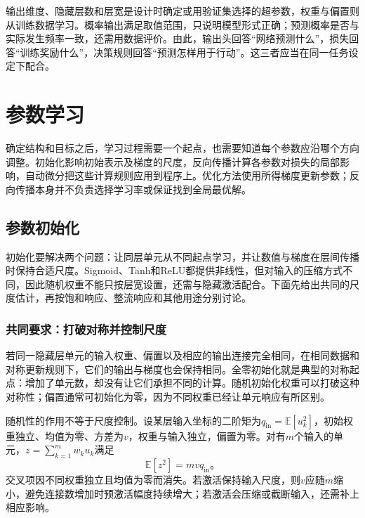 输出维度、隐藏层数和层宽是设计时确定或用验证集选择的超参数，权重与偏置则从训练数据学习。概率输出满足取值范围，只说明模型形式正确；预测概率是否与实际发生频率一致，还需用数据评价。由此，输出头回答“网络预测什么”，损失回答“训练奖励什么”，决策规则回答“预测怎样用于行动”。这三者应当在同一任务设定下配合。

\section{参数学习}
\label{sec:ffn-learning}

确定结构和目标之后，学习过程需要一个起点，也需要知道每个参数应沿哪个方向调整。初始化影响初始表示及梯度的尺度，反向传播计算各参数对损失的局部影响，自动微分把这些计算规则应用到程序上。优化方法使用所得梯度更新参数；反向传播本身并不负责选择学习率或保证找到全局最优解。

\subsection{参数初始化}
\label{sec:ffn-initialization}

初始化要解决两个问题：让同层单元从不同起点学习，并让数值与梯度在层间传播时保持合适尺度。Sigmoid、Tanh和ReLU都提供非线性，但对输入的压缩方式不同，因此随机权重不能只按层宽设置，还需与隐藏激活配合。下面先给出共同的尺度估计，再按饱和响应、整流响应和其他用途分别讨论。

\subsubsection{共同要求：打破对称并控制尺度}
\label{sec:ffn-initialization-common}

若同一隐藏层单元的输入权重、偏置以及相应的输出连接完全相同，在相同数据和对称更新规则下，它们的输出与梯度也会保持相同。全零初始化就是典型的对称起点：增加了单元数，却没有让它们承担不同的计算。随机初始化权重可以打破这种对称性；偏置通常可初始化为零，因为不同权重已经让单元响应有所区别。

随机性的作用不等于尺度控制。设某层输入坐标的二阶矩为$q_{\mathrm{in}}=\mathbb{E}[u_k^2]$，初始权重独立、均值为零、方差为$v$，权重与输入独立，偏置为零。对有$m$个输入的单元，$z=\sum_{k=1}^{m}w_k u_k$满足
\begin{equation}
  \mathbb{E}[z^2]=m v q_{\mathrm{in}}\text{。}
  \label{eq:ffn-initial-signal-scale}
\end{equation}
交叉项因不同权重独立且均值为零而消失。若激活保持输入尺度，则$v$应随$m$缩小，避免连接数增加时预激活幅度持续增大；若激活会压缩或截断输入，还需补上相应影响。

